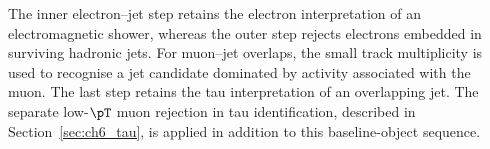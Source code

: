 The inner electron--jet step retains the electron interpretation of an electromagnetic shower, whereas the outer step rejects electrons embedded in surviving hadronic jets.
For muon--jet overlaps, the small track multiplicity is used to recognise a jet candidate dominated by activity associated with the muon.
The last step retains the tau interpretation of an overlapping jet.
The separate low-$\pT$ muon rejection in tau identification, described in Section~\ref{sec:ch6_tau}, is applied in addition to this baseline-object sequence.
